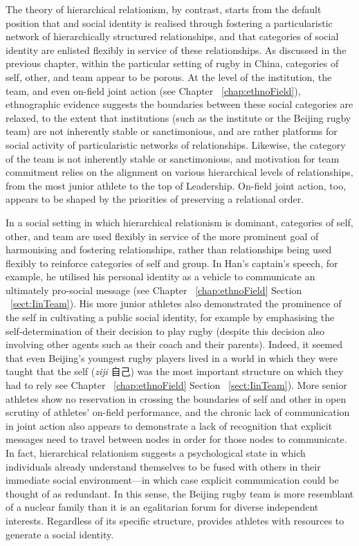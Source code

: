 \begin{CJK}{UTF8}{gbsn}
The theory of hierarchical relationism, by contrast, starts from the default position that and social identity is realised through fostering a particularistic network of hierarchically structured relationships, and that categories of social identity are enlisted flexibly in service of these relationships.  As discussed in the previous chapter, within the particular setting of rugby in China, categories of self, other, and team appear to be porous.  At the level of the institution, the team, and even on-field joint action (see Chapter ~\ref{chap:ethnoField}), ethnographic evidence suggests the boundaries between these social categories are relaxed, to the extent that institutions (such as the institute or the Beijing rugby team) are not inherently stable or sanctimonious, and are rather platforms for social activity of particularistic networks of relationships.  Likewise, the category of the team is not inherently stable or sanctimonious, and motivation for team commitment relies on the alignment on various hierarchical levels of relationships, from the most junior athlete to the top of Leadership. On-field joint action, too, appears to be shaped by the priorities of preserving a relational order.

In a social setting in which hierarchical relationism is dominant, categories of self, other, and team are used flexibly in service of the more prominent goal of harmonising and fostering relationships, rather than relationships being used flexibly to reinforce categories of self and group.  In Han's captain's speech, for example, he utilised his personal identity as a vehicle to communicate an ultimately pro-social message (see Chapter ~\ref{chap:ethnoField} Section ~\ref{sect:IinTeam}).  His more junior athletes also demonstrated the prominence of the self in cultivating a public social identity, for example by emphasising the self-determination of their decision to play rugby (despite this decision also involving other agents such as their coach and their parents).  Indeed, it seemed that even Beijing's youngest rugby players lived in a world in which they were taught that the self (\textit{ziji} 自己) was the most important structure on which they had to rely see Chapter ~\ref{chap:ethnoField} Section ~\ref{sect:IinTeam}). More senior athletes show no reservation in crossing the boundaries of self and other in open scrutiny of athletes' on-field performance, and the chronic lack of communication in joint action also appears to demonstrate a lack of recognition that explicit messages need to travel between nodes in order for those nodes to communicate.  In fact, hierarchical relationism suggests a psychological state in which individuals already understand themselves to be fused with others in their immediate social environment---in which case explicit communication could be thought of as redundant.  In this sense, the Beijing rugby team is more resemblant of a nuclear family than it is an egalitarian forum for diverse independent interests. Regardless of its specific structure, provides athletes with resources to generate a social identity.


\end{CJK}

